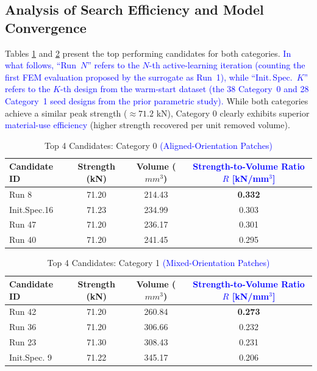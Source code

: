 \documentclass[
  preprint,
  12pt,
  a4paper
]{elsarticle}
\newcommand{\new}[1]{\textcolor{blue}{#1}}
\begin{document}
\subsection{Analysis of Search Efficiency and Model Convergence}
Tables \ref{tab:cat0_candidates} and \ref{tab:cat1_candidates} present the top performing candidates for both categories. \new{In what follows, ``Run~$N$'' refers to the $N$-th active-learning iteration (counting the first FEM evaluation proposed by the surrogate as Run~1), while ``Init.\,Spec.~$K$'' refers to the $K$-th design from the warm-start dataset (the 38 Category~0 and 28 Category~1 seed designs from the prior parametric study).} While both categories achieve a similar peak strength ($\approx 71.2$ kN), Category 0 clearly exhibits superior \new{material-use efficiency} (higher strength recovered per unit removed volume).

\begin{table}[htbp]
    \centering
    \caption{Top 4 Candidates: Category 0 \new{(Aligned-Orientation Patches)}}
    \label{tab:cat0_candidates}
    \begin{tabular}{l c c c}
        \toprule
        \textbf{Candidate ID} & \textbf{Strength (kN)} & \textbf{Volume ($mm^3$)} & \textbf{\new{Strength-to-Volume Ratio $R$ [kN/mm$^3$]}} \\
        \midrule
        Run 8 & 71.20 & 214.43 & \textbf{0.332} \\
        Init.Spec.16 & 71.23 & 234.99 & 0.303 \\
        Run 47 & 71.20 & 236.17 & 0.301 \\
        Run 40 & 71.20 & 241.45 & 0.295 \\
        \bottomrule
    \end{tabular}
\end{table}

\begin{table}[htbp]
    \centering
    \caption{Top 4 Candidates: Category 1 \new{(Mixed-Orientation Patches)}}
    \label{tab:cat1_candidates}
    \begin{tabular}{l c c c}
        \toprule
        \textbf{Candidate ID} & \textbf{Strength (kN)} & \textbf{Volume ($mm^3$)} & \textbf{\new{Strength-to-Volume Ratio $R$ [kN/mm$^3$]}} \\
        \midrule
        Run 42 & 71.20 & 260.84 & \textbf{0.273} \\
        Run 36 & 71.20 & 306.66 & 0.232 \\
        Run 23 & 71.30 & 308.43 & 0.231 \\
        Init.Spec. 9 & 71.22 & 345.17 & 0.206 \\
        \bottomrule
    \end{tabular}
\end{table}
\end{document}
